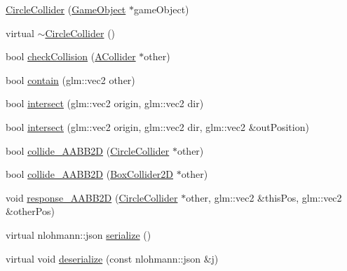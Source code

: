 \begin{DoxyCompactItemize}
\item 
\mbox{\hyperlink{class_beer_engine_1_1_component_1_1_circle_collider_ae79d96d3b73a4a43d9305da69e739ac0}{Circle\+Collider}} (\mbox{\hyperlink{class_beer_engine_1_1_game_object}{Game\+Object}} $\ast$game\+Object)
\item 
virtual \mbox{\hyperlink{class_beer_engine_1_1_component_1_1_circle_collider_ad5e2682e2e9bed78717933e4201326bd}{$\sim$\+Circle\+Collider}} ()
\item 
bool \mbox{\hyperlink{class_beer_engine_1_1_component_1_1_circle_collider_a7443f2cadac6ae282025a6757ad2b3c8}{check\+Collision}} (\mbox{\hyperlink{class_beer_engine_1_1_component_1_1_a_collider}{A\+Collider}} $\ast$other)
\item 
bool \mbox{\hyperlink{class_beer_engine_1_1_component_1_1_circle_collider_a0660c296e993b8bfbebb8524bca4cea7}{contain}} (glm\+::vec2 other)
\item 
bool \mbox{\hyperlink{class_beer_engine_1_1_component_1_1_circle_collider_a60737b2c9898672d28aa09b56c7fa07c}{intersect}} (glm\+::vec2 origin, glm\+::vec2 dir)
\item 
bool \mbox{\hyperlink{class_beer_engine_1_1_component_1_1_circle_collider_a0402e8e6605a5c2c7aefa9befdcd15e5}{intersect}} (glm\+::vec2 origin, glm\+::vec2 dir, glm\+::vec2 \&out\+Position)
\item 
bool \mbox{\hyperlink{class_beer_engine_1_1_component_1_1_circle_collider_a20e45eaf7bb9ca22573e0fda117ae274}{collide\+\_\+\+A\+A\+B\+B2D}} (\mbox{\hyperlink{class_beer_engine_1_1_component_1_1_circle_collider}{Circle\+Collider}} $\ast$other)
\item 
bool \mbox{\hyperlink{class_beer_engine_1_1_component_1_1_circle_collider_a9e88d5908734005d0141a75b8b02fd78}{collide\+\_\+\+A\+A\+B\+B2D}} (\mbox{\hyperlink{class_beer_engine_1_1_component_1_1_box_collider2_d}{Box\+Collider2D}} $\ast$other)
\item 
void \mbox{\hyperlink{class_beer_engine_1_1_component_1_1_circle_collider_aeec35819ad13cf21e80745d3a1ae9651}{response\+\_\+\+A\+A\+B\+B2D}} (\mbox{\hyperlink{class_beer_engine_1_1_component_1_1_circle_collider}{Circle\+Collider}} $\ast$other, glm\+::vec2 \&this\+Pos, glm\+::vec2 \&other\+Pos)
\item 
virtual nlohmann\+::json \mbox{\hyperlink{class_beer_engine_1_1_component_1_1_circle_collider_a9898927635bb575aa2895cc5516433fc}{serialize}} ()
\item 
virtual void \mbox{\hyperlink{class_beer_engine_1_1_component_1_1_circle_collider_a25651d52d7b584deb7f82b09037124d5}{deserialize}} (const nlohmann\+::json \&j)
\end{DoxyCompactItemize}

